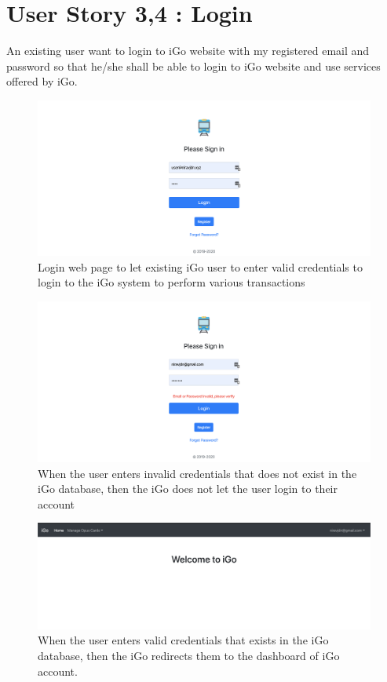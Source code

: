 \documentclass[11pt, english]{report}
\begin{document}
\section{User Story 3,4 : Login} 
An existing user want to login to iGo website with my registered email and password so that he/she shall be able to login to iGo website and use services offered by iGo.


\begin{figure}[H]
  \includegraphics[width=1\textwidth]{images/login_page.png}
  \centering
  \caption{Login web page to let existing iGo user to enter valid credentials to login to the iGo system to perform various transactions
}
\end{figure}

\begin{figure}[H]
  \includegraphics[width=1\textwidth]{images/invalid_credz.png}
  \centering
  \caption{When the user enters invalid credentials that does not exist in the iGo database, then the iGo does not let the user login to their account
}
\end{figure}

\begin{figure}[H]
  \includegraphics[width=1\textwidth]{images/login_successful.png}
  \centering
  \caption{When the user enters valid credentials that exists in the iGo database, then the iGo redirects them to the dashboard of iGo account.
}
\end{figure}
\end{document}
